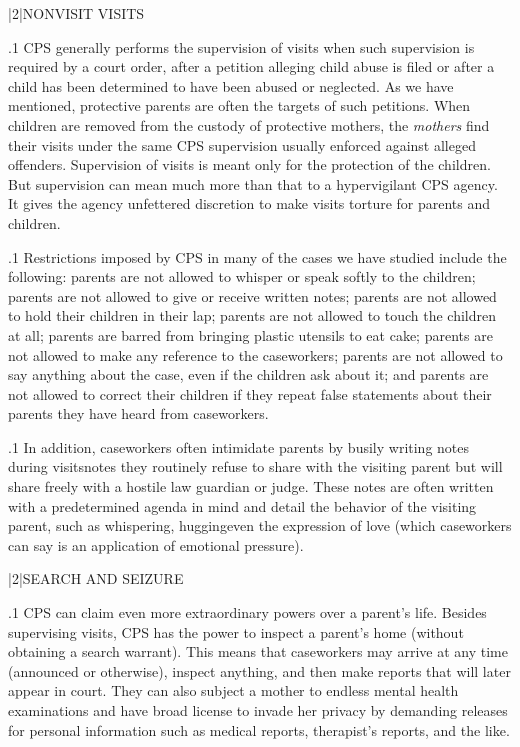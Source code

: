 \documentclass[11pt, twoside]{article}
\begin{document}
{\s|2|{NONVISIT VISITS}

\p.1{%
\noindent{}CPS generally performs the supervision of visits when such supervision
is required by a court order, after a petition alleging child abuse is filed
or after a child has been determined to have been abused or neglected.
As we have mentioned, protective parents are often the targets of such
petitions. When children are removed from the custody of protective
mothers, the \textit{mothers} find their visits under the same CPS supervision
usually enforced against alleged offenders.
Supervision of visits is meant only for the protection of the children.
But supervision can mean much more than that to a hypervigilant CPS
agency. It gives the agency unfettered discretion to make visits torture
for parents and children.
}%

\p.1{%
Restrictions imposed by CPS in many of the cases we have studied
include the following: parents are not allowed to whisper or speak softly
to the children; parents are not allowed to give or receive written notes;
parents are not allowed to hold their children in their lap; parents are
not allowed to touch the children at all; parents are barred from bringing
plastic utensils to eat cake; parents are not allowed to make any reference
to the caseworkers; parents are not allowed to say anything about the
case, even if the children ask about it; and parents are not allowed to
correct their children if they repeat false statements about their parents
they have heard from caseworkers.
}%

\p.1{%
In addition, caseworkers often intimidate parents by busily writing
notes during visits\mdash{}notes they routinely refuse to share with the visiting parent but will share freely with a hostile law guardian or judge.
These notes are often written with a predetermined agenda in mind and
detail the  behavior of the visiting parent, such as whispering,  hugging\mdash{}even the expression of  love
(which caseworkers can say is an application of emotional pressure).
}%


\s|2|{SEARCH AND SEIZURE}

\p.1{%
\noindent{}CPS can claim even more extraordinary powers over a parent's life. Besides supervising visits, CPS has the power to inspect a parent's home
(without obtaining a search warrant). This means that caseworkers may
arrive at any time (announced or otherwise), inspect anything, and then
make reports that will later appear in court. They can also subject a
mother to endless mental health examinations and have broad license
to invade her privacy by demanding releases for personal information
such as medical reports, therapist's reports, and the like.
}%

}
\end{document}
